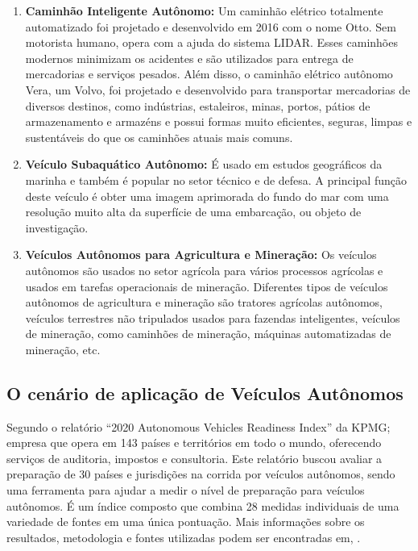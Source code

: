 \begin{enumerate}
\item \textbf{Caminhão Inteligente Autônomo:} Um caminhão elétrico totalmente automatizado foi projetado e desenvolvido em 2016 com o nome Otto. Sem motorista humano, opera com a ajuda do sistema LIDAR. Esses caminhões modernos minimizam os acidentes e são utilizados para entrega de mercadorias e serviços pesados. Além disso, o caminhão elétrico autônomo Vera, um Volvo, foi projetado e desenvolvido para transportar mercadorias de diversos destinos, como indústrias, estaleiros, minas, portos, pátios de armazenamento e armazéns e possui formas muito eficientes, seguras, limpas e sustentáveis do que os caminhões atuais mais comuns.

\item \textbf{Veículo Subaquático Autônomo:} É usado em estudos geográficos da marinha e também é popular no setor técnico e de defesa. A principal função deste veículo é obter uma imagem aprimorada do fundo do mar com uma resolução muito alta da superfície de uma embarcação, ou objeto de investigação.
\item \textbf{Veículos Autônomos para Agricultura e Mineração:}  Os veículos autônomos são usados no setor agrícola para vários processos agrícolas e usados em tarefas operacionais de mineração. Diferentes tipos de veículos autônomos de agricultura e mineração são tratores agrícolas autônomos, veículos terrestres não tripulados usados para fazendas inteligentes, veículos de mineração, como caminhões de mineração, máquinas automatizadas de mineração, etc.

\end{enumerate}

\subsection{O cenário de aplicação de Veículos Autônomos}
Segundo o relatório “2020 Autonomous Vehicles Readiness Index” da KPMG; empresa que opera em 143 países e territórios em todo o mundo, oferecendo serviços de auditoria, impostos e consultoria. Este relatório buscou avaliar a preparação de 30 países e jurisdições na corrida por veículos autônomos, sendo uma ferramenta para ajudar a medir o nível de preparação para veículos autônomos. É um índice composto que combina 28 medidas individuais de uma variedade de fontes em uma única pontuação. Mais informações sobre os resultados, metodologia e fontes utilizadas podem ser encontradas em, \cite{KPMG}.

